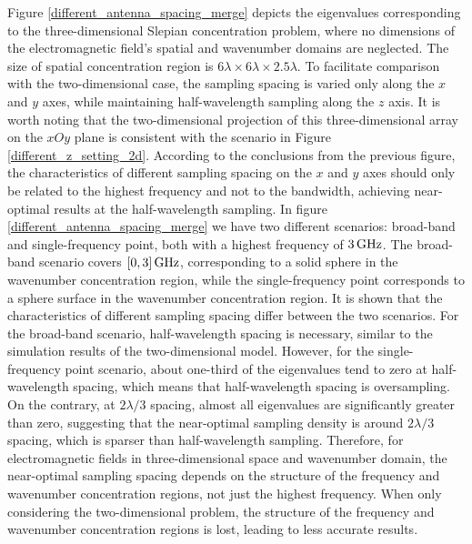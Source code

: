 \documentclass[12pt,draftclsnofoot,journal,onecolumn]{IEEEtran}
\begin{document}
		 Figure \ref{different_antenna_spacing_merge} depicts the eigenvalues corresponding to the three-dimensional Slepian concentration problem, where no dimensions of the electromagnetic field's spatial and wavenumber domains are neglected. The size of spatial concentration region is $6\lambda \times 6\lambda \times 2.5\lambda$. To facilitate comparison with the two-dimensional case, the sampling spacing is varied only along the $x$ and $y$ axes, while maintaining half-wavelength sampling along the $z$ axis. It is worth noting that the two-dimensional projection of this three-dimensional array on the $xOy$ plane is consistent with the scenario in Figure \ref{different_z_setting_2d}. According to the conclusions from the previous figure, the characteristics of different sampling spacing on the $x$ and $y$ axes should only be related to the highest frequency and not to the bandwidth, achieving near-optimal results at the half-wavelength sampling. In figure \ref{different_antenna_spacing_merge} we have two different scenarios: broad-band and single-frequency point, both with a highest frequency of $3\,{\rm GHz}$. The broad-band scenario covers $[0,3]\,{\rm GHz}$, corresponding to a solid sphere in the wavenumber concentration region, while the single-frequency point corresponds to a sphere surface in the wavenumber concentration region. It is shown that the characteristics of different sampling spacing differ between the two scenarios. For the broad-band scenario, half-wavelength spacing is necessary, similar to the simulation results of the two-dimensional model. However, for the single-frequency point scenario, about one-third of the eigenvalues tend to zero at half-wavelength spacing, which means that half-wavelength spacing is oversampling. On the contrary, at $2\lambda/3$ spacing, almost all eigenvalues are significantly greater than zero, suggesting that the near-optimal sampling density is around $2\lambda/3$ spacing, which is sparser than half-wavelength sampling. Therefore, for electromagnetic fields in three-dimensional space and wavenumber domain, the near-optimal sampling spacing depends on the structure of the frequency and wavenumber concentration regions, not just the highest frequency. When only considering the two-dimensional problem, the structure of the frequency and wavenumber concentration regions is lost, leading to less accurate results.
	
\end{document}
